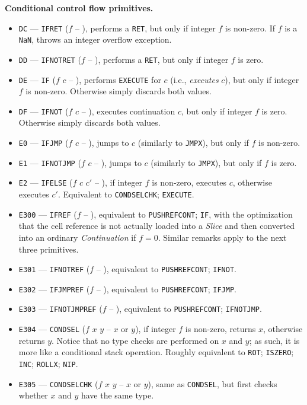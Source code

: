 \documentclass[12pt,oneside]{article}
\def\makepoint#1{\medbreak\noindent{\bf #1.\ }}
\def\nxsubpoint{\refstepcounter{subsubsection}%
    \smallbreak\makepoint{\thesubsubsection}}
\def\emb#1{\textbf{#1.}}
\begin{document}
\nxsubpoint\emb{Conditional control flow primitives}\label{sp:prim.cond.flow}
\begin{itemize}
\item {\tt DC} --- {\tt IFRET} ($f$ -- ), performs a {\tt RET}, but only if integer $f$ is non-zero. If $f$ is a {\tt NaN}, throws an integer overflow exception.
\item {\tt DD} --- {\tt IFNOTRET} ($f$ -- ), performs a {\tt RET}, but only if integer $f$ is zero.
\item {\tt DE} --- {\tt IF} ($f$ $c$ -- ), performs {\tt EXECUTE} for $c$ (i.e., {\em executes} $c$), but only if integer $f$ is non-zero. Otherwise simply discards both values.
\item {\tt DF} --- {\tt IFNOT} ($f$ $c$ -- ), executes continuation $c$, but only if integer $f$ is zero. Otherwise simply discards both values.
\item {\tt E0} --- {\tt IFJMP} ($f$ $c$ -- ), jumps to $c$ (similarly to {\tt JMPX}), but only if $f$ is non-zero.
\item {\tt E1} --- {\tt IFNOTJMP} ($f$ $c$ -- ), jumps to $c$ (similarly to {\tt JMPX}), but only if $f$ is zero.
\item {\tt E2} --- {\tt IFELSE} ($f$ $c$ $c'$ -- ), if integer $f$ is non-zero, executes $c$, otherwise executes $c'$. Equivalent to {\tt CONDSELCHK}; {\tt EXECUTE}.
\item {\tt E300} --- {\tt IFREF} ($f$ -- ), equivalent to {\tt PUSHREFCONT}; {\tt IF}, with the optimization that the cell reference is not actually loaded into a {\em Slice} and then converted into an ordinary {\em Continuation\/} if $f=0$. Similar remarks apply to the next three primitives.
\item {\tt E301} --- {\tt IFNOTREF} ($f$ -- ), equivalent to {\tt PUSHREFCONT}; {\tt IFNOT}.
\item {\tt E302} --- {\tt IFJMPREF} ($f$ -- ), equivalent to {\tt PUSHREFCONT}; {\tt IFJMP}.
\item {\tt E303} --- {\tt IFNOTJMPREF} ($f$ -- ), equivalent to {\tt PUSHREFCONT}; {\tt IFNOTJMP}.
\item {\tt E304} --- {\tt CONDSEL} ($f$ $x$ $y$ -- $x$ or $y$), if integer $f$ is non-zero, returns $x$, otherwise returns $y$. Notice that no type checks are performed on $x$ and $y$; as such, it is more like a conditional stack operation. Roughly equivalent to {\tt ROT}; {\tt ISZERO}; {\tt INC}; {\tt ROLLX}; {\tt NIP}.
\item {\tt E305} --- {\tt CONDSELCHK} ($f$ $x$ $y$ -- $x$ or $y$), same as {\tt CONDSEL}, but first checks whether $x$ and $y$ have the same type.

\end{itemize}
\end{document}
